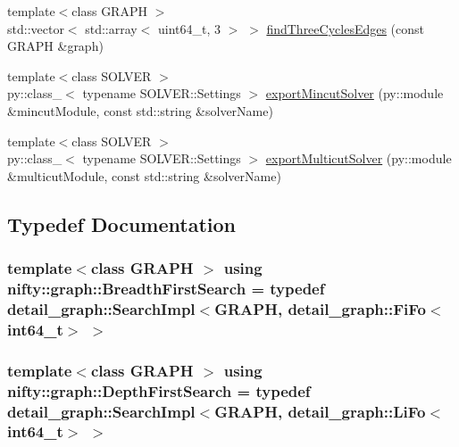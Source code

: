 \begin{DoxyCompactItemize}
{\footnotesize template$<$class G\+R\+A\+P\+H $>$ }\\std\+::vector$<$ std\+::array$<$ uint64\+\_\+t, 3 $>$ $>$ \hyperlink{namespacenifty_1_1graph_ad3135898f4d621d7b498e65c7b5f38c1}{find\+Three\+Cycles\+Edges} (const G\+R\+A\+P\+H \&graph)
\item 
{\footnotesize template$<$class S\+O\+L\+V\+E\+R $>$ }\\py\+::class\+\_\+$<$ typename S\+O\+L\+V\+E\+R\+::\+Settings $>$ \hyperlink{namespacenifty_1_1graph_ad304a503382b3ea561ceb56ed5cc4ff9}{export\+Mincut\+Solver} (py\+::module \&mincut\+Module, const std\+::string \&solver\+Name)
\item 
{\footnotesize template$<$class S\+O\+L\+V\+E\+R $>$ }\\py\+::class\+\_\+$<$ typename S\+O\+L\+V\+E\+R\+::\+Settings $>$ \hyperlink{namespacenifty_1_1graph_a26bca8c08ab4a4deb3b53b511c166919}{export\+Multicut\+Solver} (py\+::module \&multicut\+Module, const std\+::string \&solver\+Name)
\end{DoxyCompactItemize}


\subsection{Typedef Documentation}
\hypertarget{namespacenifty_1_1graph_a5cdea7eb940a178738d5f7ba11b92a15}{}
\subsubsection[{Breadth\+First\+Search}]{\setlength{\rightskip}{0pt plus 5cm}template$<$class G\+R\+A\+P\+H $>$ using {\bf nifty\+::graph\+::\+Breadth\+First\+Search} = typedef {\bf detail\+\_\+graph\+::\+Search\+Impl}$<$G\+R\+A\+P\+H, {\bf detail\+\_\+graph\+::\+Fi\+Fo}$<$int64\+\_\+t$>$ $>$}\label{namespacenifty_1_1graph_a5cdea7eb940a178738d5f7ba11b92a15}
\hypertarget{namespacenifty_1_1graph_a3d6d4a5216a5d0a11785373bc7537085}{}
\subsubsection[{Depth\+First\+Search}]{\setlength{\rightskip}{0pt plus 5cm}template$<$class G\+R\+A\+P\+H $>$ using {\bf nifty\+::graph\+::\+Depth\+First\+Search} = typedef {\bf detail\+\_\+graph\+::\+Search\+Impl}$<$G\+R\+A\+P\+H, {\bf detail\+\_\+graph\+::\+Li\+Fo}$<$int64\+\_\+t$>$ $>$}\label{namespacenifty_1_1graph_a3d6d4a5216a5d0a11785373bc7537085}
\hypertarget{namespacenifty_1_1graph_a45cca2dcd061996d13ec8e6bb8afb200}{}
